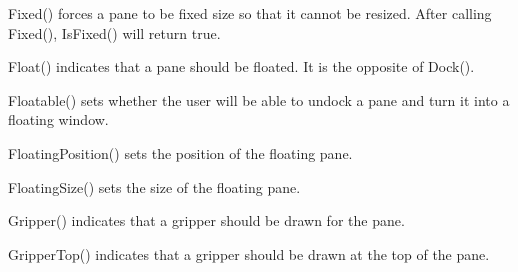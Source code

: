 
Fixed() forces a pane to be fixed size so that it cannot be resized. After calling Fixed(), IsFixed() will return true.

\label{wxauipaneinfofloat}


Float() indicates that a pane should be floated.  It is the opposite of Dock().

\label{wxauipaneinfofloatable}


Floatable() sets whether the user will be able to undock a pane and turn it into a floating window.

\label{wxauipaneinfofloatingposition}



FloatingPosition() sets the position of the floating pane.

\label{wxauipaneinfofloatingsize}



FloatingSize() sets the size of the floating pane.

\label{wxauipaneinfogripper}


Gripper() indicates that a gripper should be drawn for the pane.

\label{wxauipaneinfogrippertop}


GripperTop() indicates that a gripper should be drawn at the top of the pane.

\label{wxauipaneinfohasborder}


